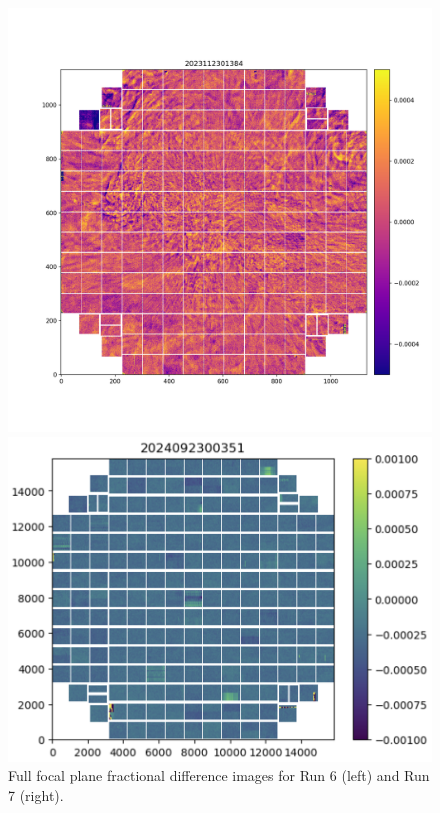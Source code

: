 \begin{figure}[htbp]
\centering
\begin{minipage}{0.45\textwidth}
    \centering
    \includegraphics[width=\linewidth]{sections/figures/Run6_Weather.png}
\end{minipage}
\begin{minipage}{0.5\textwidth}
    \centering
    \includegraphics[width=\linewidth]{sections/figures/Run7_WeatherDiffuser.png}
\end{minipage}    
    \caption{Full focal plane fractional difference images for Run 6 (left) and Run 7 (right).}

\label{fig:weather}
\end{figure}

